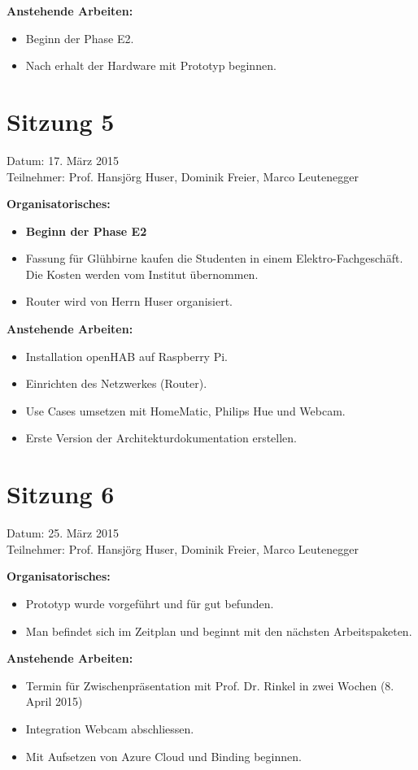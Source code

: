 	\textbf{Anstehende Arbeiten:}
	\begin{itemize}
		\item Beginn der Phase E2.
		\item Nach erhalt der Hardware mit Prototyp beginnen.
	\end{itemize}

\section*{Sitzung 5}
	Datum: 17. März 2015 \\
	Teilnehmer: Prof. Hansjörg Huser, Dominik Freier, Marco Leutenegger

	\textbf{Organisatorisches:}
	\begin{itemize}
		\item \textbf{Beginn der Phase E2}
		\item Fassung für Glühbirne kaufen die Studenten in einem Elektro-Fachgeschäft. Die Kosten werden vom Institut übernommen.
		\item Router wird von Herrn Huser organisiert.
	\end{itemize}

	\textbf{Anstehende Arbeiten:}
	\begin{itemize}
		\item Installation openHAB auf Raspberry Pi.
		\item Einrichten des Netzwerkes (Router).
		\item Use Cases umsetzen mit HomeMatic, Philips Hue und Webcam.
		\item Erste Version der Architekturdokumentation erstellen.
	\end{itemize}

\section*{Sitzung 6}
	Datum: 25. März 2015 \\
	Teilnehmer: Prof. Hansjörg Huser, Dominik Freier, Marco Leutenegger

	\textbf{Organisatorisches:}
	\begin{itemize}
		\item Prototyp wurde vorgeführt und für gut befunden.
		\item Man befindet sich im Zeitplan und beginnt mit den nächsten Arbeitspaketen.
	\end{itemize}

	\textbf{Anstehende Arbeiten:}
	\begin{itemize}
		\item Termin für Zwischenpräsentation mit Prof. Dr. Rinkel in zwei Wochen (8. April 2015)
		\item Integration Webcam abschliessen.
		\item Mit Aufsetzen von Azure Cloud und Binding beginnen.
	\end{itemize}
	
